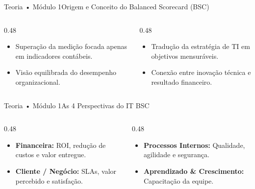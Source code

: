 \begin{senaiframe}{Teoria • Módulo 1}{Origem e Conceito do Balanced Scorecard (BSC)}
  \begin{columns}[t]
    \begin{column}{0.48\textwidth}
      \begin{tcolorbox}[senaibluecard, title={Kaplan \& Norton (1992)}]
        \begin{itemize}
          \item Superação da medição focada apenas em indicadores contábeis.
          \item Visão equilibrada do desempenho organizacional.
        \end{itemize}
      \end{tcolorbox}
    \end{column}
    \begin{column}{0.48\textwidth}
      \begin{tcolorbox}[senaicard, title={Adaptação para a TI (IT BSC)}]
        \begin{itemize}
          \item Tradução da estratégia de TI em objetivos mensuráveis.
          \item Conexão entre inovação técnica e resultado financeiro.
        \end{itemize}
      \end{tcolorbox}
    \end{column}
  \end{columns}
\end{senaiframe}

\begin{senaiframe}{Teoria • Módulo 1}{As 4 Perspectivas do IT BSC}
  \begin{columns}[t]
    \begin{column}{0.48\textwidth}
      \begin{tcolorbox}[senaibluecard, title={Financeira \& Cliente}]
        \begin{itemize}
          \item \textbf{Financeira:} ROI, redução de custos e valor entregue.
          \item \textbf{Cliente / Negócio:} SLAs, valor percebido e satisfação.
        \end{itemize}
      \end{tcolorbox}
    \end{column}
    \begin{column}{0.48\textwidth}
      \begin{tcolorbox}[senaiambercard, title={Processos \& Aprendizado}]
        \begin{itemize}
          \item \textbf{Processos Internos:} Qualidade, agilidade e segurança.
          \item \textbf{Aprendizado \& Crescimento:} Capacitação da equipe.
        \end{itemize}
      \end{tcolorbox}
    \end{column}
  \end{columns}
\end{senaiframe}


